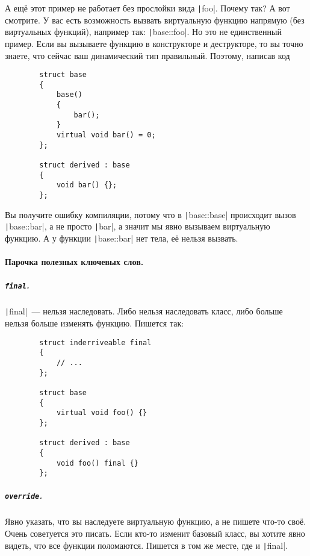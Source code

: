 \documentclass{article}
\begin{document}
    А ещё этот пример не работает без прослойки вида \texttt|foo|. Почему так? А вот смотрите. У вас есть возможность вызвать виртуальную функцию напрямую (без виртуальных функций), например так: \texttt|base::foo|. Но это не единственный пример. Если вы вызываете функцию в конструкторе и деструкторе, то вы точно знаете, что сейчас ваш динамический тип правильный. Поэтому, написав код
    \begin{verbatim}
        struct base
        {
            base()
            {
                bar();
            }
            virtual void bar() = 0;
        };
        
        struct derived : base
        {
            void bar() {};
        };
    \end{verbatim}
    Вы получите ошибку компиляции, потому что в \texttt|base::base| происходит вызов \texttt|base::bar|, а не просто \texttt|bar|, а значит мы явно вызываем виртуальную функцию. А у функции \texttt|base::bar| нет тела, её нельзя вызвать.
    \paragraph{Парочка полезных ключевых слов.}
    \subparagraph{\texttt{final}.}
    \texttt|final|~--- нельзя наследовать. Либо нельзя наследовать класс, либо больше нельзя больше изменять функцию. Пишется так:
    \begin{verbatim}
        struct inderriveable final
        {
            // ...
        };

        struct base
        {
            virtual void foo() {}
        };

        struct derived : base
        {
            void foo() final {}
        };
    \end{verbatim}
    \subparagraph{\texttt{override}.}
    Явно указать, что вы наследуете виртуальную функцию, а не пишете что-то своё. Очень советуется это писать. Если кто-то изменит базовый класс, вы хотите явно видеть, что все функции поломаются. Пишется в том же месте, где и \texttt|final|.
\end{document}
